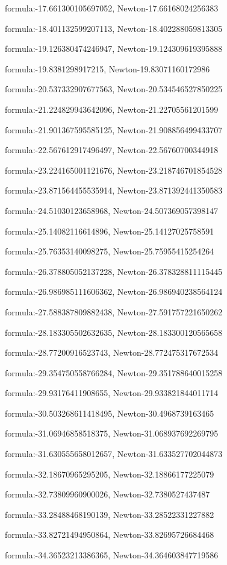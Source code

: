 \documentclass{article}
\begin{document}
formula:-17.661300105697052, Newton-17.66168024256383

formula:-18.401132599207113, Newton-18.402288059813305

formula:-19.126380474246947, Newton-19.124309619395888

formula:-19.8381298917215, Newton-19.83071160172986

formula:-20.537332907677563, Newton-20.534546527850225

formula:-21.224829943642096, Newton-21.22705561201599

formula:-21.901367595585125, Newton-21.908856499433707

formula:-22.567612917496497, Newton-22.56760700344918

formula:-23.224165001121676, Newton-23.218746701854528

formula:-23.871564455535914, Newton-23.871392441350583

formula:-24.51030123658968, Newton-24.507369057398147

formula:-25.14082116614896, Newton-25.14127025758591

formula:-25.76353140098275, Newton-25.75955415254264

formula:-26.378805052137228, Newton-26.378328811115445

formula:-26.986985111606362, Newton-26.986940238564124

formula:-27.588387809882438, Newton-27.591757221650262

formula:-28.183305502632635, Newton-28.183300120565658

formula:-28.77200916523743, Newton-28.772475317672534

formula:-29.354750558766284, Newton-29.351788640015258

formula:-29.93176411908655, Newton-29.933821844011714

formula:-30.503268611418495, Newton-30.4968739163465

formula:-31.06946858518375, Newton-31.068937692269795

formula:-31.630555658012657, Newton-31.633527702044873

formula:-32.18670965295205, Newton-32.18866177225079

formula:-32.73809960900026, Newton-32.7380527437487

formula:-33.28488468190139, Newton-33.28522331227882

formula:-33.82721494950864, Newton-33.82695726684468

formula:-34.36523213386365, Newton-34.364603847719586
\end{document}

